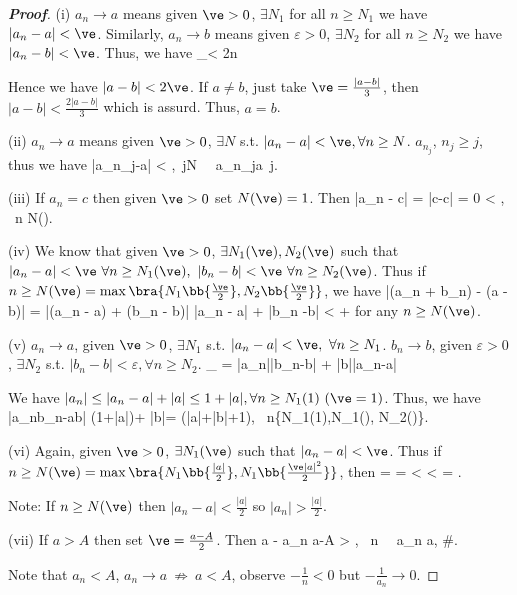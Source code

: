 \begin{proof}[\bf Proof]
\ben
\item [(i)] $a_n\to a$ means given $\ve>0$, $\exists N_1$ for all $n\geq N_1$ we have $|a_n-a|<\ve$. Similarly, $a_n\to b$ means given $\varepsilon>0$, $\exists N_2$ for all $n\geq N_2$ we have $|a_n-b|<\ve$. Thus, we have
\be
{}_{}< 2\ve {}n\geq \max{}
\ee

Hence we have $|a-b|<2\ve$. If $a\neq b$, just take $\ve=\frac{|a-b|}{3}$, then $|a-b|<\frac{2|a-b|}{3}$ which is assurd. Thus, $a=b$.

\item [(ii)] $a_n\to a$ means given $\ve >0$, $\exists N$ s.t. $|a_n-a|<\ve, \forall n\geq N$. $a_{n_j}$, $n_j\geq j$, thus we have
\be
|a_{n_j}-a| < \varepsilon,\ \forall j\geq N \ \ra \ a_{n_j}\to a\ j\to\infty.
\ee

\item [(iii)] If $a_n = c$ then given $\ve > 0$ set $N(\ve) = 1$. Then 
\be
|a_n - c| = |c-c| = 0 < \ve, \ \forall n \geq N(\ve).
\ee

\item [(iv)] We know that given $\ve > 0$, $\exists N_1(\ve),N_2(\ve)$ such that $|a_n - a| < \ve\ \forall n \geq N_1(\ve),\ |b_n - b| < \ve\ \forall n \geq N_2(\ve)$. Thus if $n \geq N(\ve) = \max\bra{N_1\bb{\frac{\ve}2}, N_2\bb{\frac{\ve}2}}$, we have
\be
|(a_n + b_n) - (a - b)| = |(a_n - a) + (b_n - b)| \leq |a_n - a| + |b_n -b| <  + 
\ee
for any $n \geq N(\ve)$.

\item [(v)] $a_n\to a$, given $\ve>0$, $\exists N_1$ s.t. $|a_n-a|<\ve, \ \forall n\geq N_1$. $b_n\to b$, given $\varepsilon>0$, $\exists N_2$ s.t. $|b_n-b|<\varepsilon, \forall n\geq N_2$.
\be
{}_{} = |a_n||b_n-b| + |b||a_n-a|
\ee

We have $|a_n|\leq |a_n-a|+|a|\leq 1+|a|,\forall n\geq N_1(1) \ (\ve=1)$. Thus, we have
\be
|a_nb_n-ab| \leq (1+|a|)\ve + |b|\ve = \ve(|a|+|b|+1), \ \forall n\geq \max\{N_1(1),N_1(\ve), N_2(\ve)\}.
\ee

\item [(vi)] Again, given $\ve > 0$, $\exists N_1(\ve)$ such that $|a_n - a| < \ve$. Thus if $n \geq N(\ve) = \max\bra{N_1\bb{\frac{|a|}{2}}, N_1\bb{\frac{\ve|a|^2}{2}}}$, then
\be
{} =  =  < < \cdot {} = \ve.
\ee

Note: If $n \geq N(\ve)$ then $|a_n - a| < \frac{|a|}{2}$ so $|a_n| > \frac{|a|}{2}$.

\item [(vii)] If $a > A$ then set $\ve = \frac{a-A}{2}$. Then 
\be
a - a_n \geq a-A > \ve, \ \forall n \ \ra \ a_n \not\to a, \#.
\ee

Note that $a_n < A$, $a_n \to a \ \not\Rightarrow\ a < A$, observe $-\frac{1}{n} < 0$ but $-\frac{1}{a_n} \to 0$.
\een
\end{proof}

